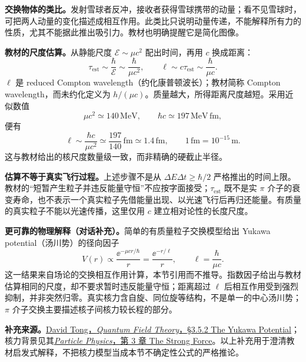 \begin{checkedsolution}
\textbf{交换物体的类比。}发射雪球者反冲，接收者获得雪球携带的动量；看不见雪球时，可把两人动量的变化描述成相互作用。此类比只说明动量传递，不能解释所有力的性质，尤其不能据此推出吸引力。教材也明确提醒它是简化图像。

\textbf{教材的尺度估算。}从静能尺度 $\mathcal E\sim\mu c^2$ 配出时间，再用 $c$ 换成距离：
\begin{equation}
  \tau_{\mathrm{est}}\sim\frac\hbar{\mathcal E}
     \sim\frac\hbar{\mu c^2},
  \qquad
  \boxed{\ell\sim c\tau_{\mathrm{est}}\sim\frac\hbar{\mu c}}.
\end{equation}
$\ell$ 是 reduced Compton wavelength（约化康普顿波长）；教材简称 Compton wavelength，而未约化定义为 $h/(\mu c)$。质量越大，所得距离尺度越短。采用近似数值
\begin{equation}
  \mu c^2\simeq140\,\mathrm{MeV},\qquad
  \hbar c\simeq197\,\mathrm{MeV\,fm},
\end{equation}
便有
\begin{equation}
  \ell\sim\frac{\hbar c}{\mu c^2}
      \simeq\frac{197}{140}\,\mathrm{fm}
      \simeq1.4\,\mathrm{fm},\qquad
  1\,\mathrm{fm}=10^{-15}\,\mathrm m.
\end{equation}
这与教材给出的核尺度数量级一致，而非精确的硬截止半径。

\textbf{估算不等于真实飞行过程。}上述步骤不是从 $\Delta E\Delta t\ge\hbar/2$ 严格推出的时间上限。教材的“短暂产生粒子并违反能量守恒”不应按字面接受；$\tau_{\mathrm{est}}$ 既不是实 $\pi$ 介子的衰变寿命，也不表示一个真实粒子先借能量出现、以光速飞行后再归还能量。有质量的真实粒子不能以光速传播，这里仅用 $c$ 建立相对论性的长度尺度。

\textbf{更可靠的物理解释（对话补充）。}简单的有质量粒子交换模型给出 Yukawa potential（汤川势）的径向因子
\begin{equation}
  V(r)\propto\frac{\ee^{-\mu cr/\hbar}}r
       =\frac{\ee^{-r/\ell}}r,\qquad
  \boxed{\ell=\frac\hbar{\mu c}}.
\end{equation}
这一结果来自场论的交换相互作用计算，本节引用而不推导。指数因子给出与教材估算相同的尺度，却不要求暂时违反能量守恒；距离超过 $\ell$ 后相互作用受到强烈抑制，并非突然归零。真实核力含自旋、同位旋等结构，不是单一的中心汤川势；$\pi$ 介子交换主要描述核子间核力较长程的部分。

\textbf{补充来源。}\href{https://www.damtp.cam.ac.uk/user/tong/qft/qfthtml/S3.html}{David Tong，\textit{Quantum Field Theory}，\S 3.5.2 The Yukawa Potential}；核力背景见其\href{https://www.damtp.cam.ac.uk/user/tong/pp/pp3.pdf}{\textit{Particle Physics}，第 3 章 The Strong Force}。以上补充用于澄清教材启发式解释，不把核力模型当成本节不确定性公式的严格推论。
\end{checkedsolution}
